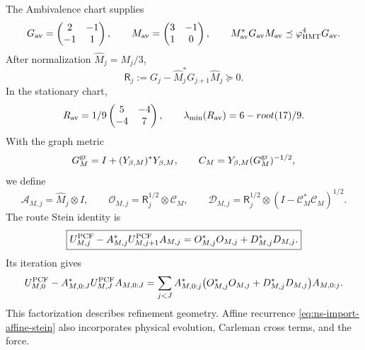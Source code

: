 The Ambivalence chart supplies
\begin{equation}
 G_{\rm av}=\begin{pmatrix}2&-1\\-1&1\end{pmatrix},
 \qquad
 M_{\rm av}=\begin{pmatrix}3&-1\\1&0\end{pmatrix},
 \qquad
 M_{\rm av}^*G_{\rm av}M_{\rm av}
 \preceq\varphi_{\rm HMT}^4G_{\rm av}.
 \label{eq:nsclose-ambivalence-route-metric}
\end{equation}
After normalization \(\widehat M_j=M_j/3\),
\begin{equation}
 \mathsf R_j:=G_j-\widehat M_j^*G_{j+1}\widehat M_j\succeq0.
 \label{eq:nsclose-route-exact-defect}
\end{equation}
In the stationary chart,
\[
 \mathsf R_{\rm av}
 =\frac19\begin{pmatrix}5&-4\\-4&7\end{pmatrix},
 \qquad
 \lambda_{\min}(\mathsf R_{\rm av})
 =\frac{6-\sqrt{17}}9.
\]
With the graph metric
\[
 \mathsf G_M^{\rm gr}
 =I+(\mathcal Y_{\beta,M})^*\mathcal Y_{\beta,M},
 \qquad
 \mathcal C_M
 =\mathcal Y_{\beta,M}(\mathsf G_M^{\rm gr})^{-1/2},
\]
we define
\begin{equation}
 \mathcal A_{M,j}=\widehat M_j\otimes I,
 \qquad
 \mathcal O_{M,j}=\mathsf R_j^{1/2}\otimes\mathcal C_M,
 \qquad
 \mathcal D_{M,j}
 =\mathsf R_j^{1/2}\otimes(I-\mathcal C_M^*\mathcal C_M)^{1/2}.
 \label{eq:nsclose-owner-route-column}
\end{equation}
The route Stein identity is
\begin{equation}
 \boxed{
 \mathsf U_{M,j}^{\rm PCF}
 -\mathcal A_{M,j}^*\mathsf U_{M,j+1}^{\rm PCF}\mathcal A_{M,j}
 =\mathcal O_{M,j}^*\mathcal O_{M,j}
  +\mathcal D_{M,j}^*\mathcal D_{M,j}.}
 \label{eq:nsclose-owner-stein}
\end{equation}
Its iteration gives
\begin{equation}
 \begin{aligned}
 \mathsf U_{M,0}^{\rm PCF}
 -\mathcal A_{M,0:J}^*\mathsf U_{M,J}^{\rm PCF}\mathcal A_{M,0:J}
 =\sum_{j<J}\mathcal A_{M,0:j}^*
 \bigl(\mathcal O_{M,j}^*\mathcal O_{M,j}
      +\mathcal D_{M,j}^*\mathcal D_{M,j}\bigr)
 \mathcal A_{M,0:j}.
 \end{aligned}
 \label{eq:nsclose-owner-stein-telescope}
\end{equation}
This factorization describes refinement geometry. Affine recurrence \eqref{eq:ns-import-affine-stein} also incorporates physical evolution, Carleman cross terms, and the force.

